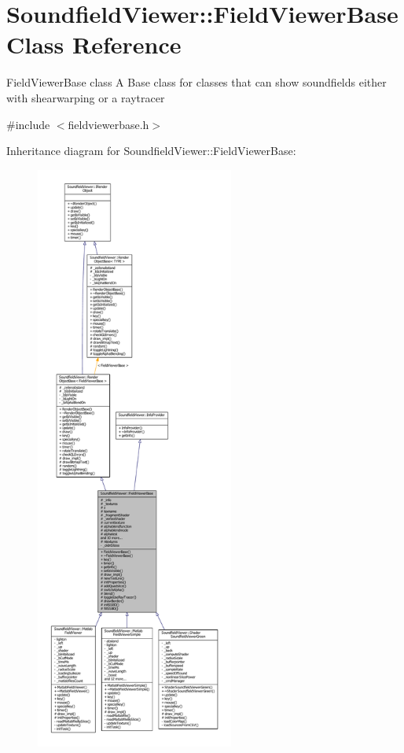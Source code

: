 \section{Soundfield\-Viewer\-:\-:Field\-Viewer\-Base Class Reference}
\label{classSoundfieldViewer_1_1FieldViewerBase}


Field\-Viewer\-Base class A Base class for classes that can show soundfields either with shearwarping or a raytracer  




{\ttfamily \#include $<$fieldviewerbase.\-h$>$}



Inheritance diagram for Soundfield\-Viewer\-:\-:Field\-Viewer\-Base\-:\nopagebreak
\begin{figure}[H]
\begin{center}
\leavevmode
\includegraphics[height=550pt]{d1/dab/classSoundfieldViewer_1_1FieldViewerBase__inherit__graph}
\end{center}
\end{figure}


